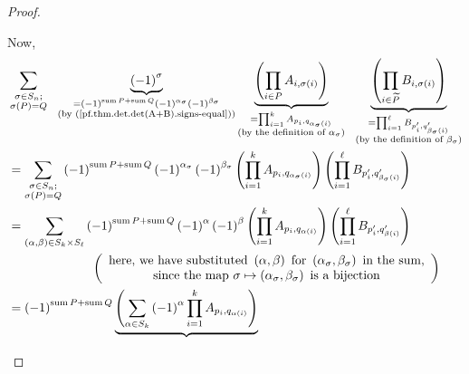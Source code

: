 \begin{proof}
\begin{fineprint}
Now,%
\begin{align}
&  \sum_{\substack{\sigma\in S_{n};\\\sigma\left(  P\right)  =Q}%
}\ \ \underbrace{\left(  -1\right)  ^{\sigma}}_{\substack{=\left(  -1\right)
^{\operatorname*{sum}P+\operatorname*{sum}Q}\left(  -1\right)  ^{\alpha
_{\sigma}}\left(  -1\right)  ^{\beta_{\sigma}}\\\text{(by
(\ref{pf.thm.det.det(A+B).signs-equal}))}}}\underbrace{\left(  \prod
\limits_{i\in P}A_{i,\sigma\left(  i\right)  }\right)  }_{\substack{=\prod
_{i=1}^{k}A_{p_{i},q_{\alpha_{\sigma}\left(  i\right)  }}\\\text{(by the
definition of }\alpha_{\sigma}\text{)}}}\ \ \underbrace{\left(  \prod
\limits_{i\in\widetilde{P}}B_{i,\sigma\left(  i\right)  }\right)
}_{\substack{=\prod_{i=1}^{\ell}B_{p_{i}^{\prime},q_{\beta_{\sigma}\left(
i\right)  }^{\prime}}\\\text{(by the definition of }\beta_{\sigma}\text{)}%
}}\nonumber\\
&  =\sum_{\substack{\sigma\in S_{n};\\\sigma\left(  P\right)  =Q}}\left(
-1\right)  ^{\operatorname*{sum}P+\operatorname*{sum}Q}\left(  -1\right)
^{\alpha_{\sigma}}\left(  -1\right)  ^{\beta_{\sigma}}\left(  \prod_{i=1}%
^{k}A_{p_{i},q_{\alpha_{\sigma}\left(  i\right)  }}\right)  \left(
\prod_{i=1}^{\ell}B_{p_{i}^{\prime},q_{\beta_{\sigma}\left(  i\right)
}^{\prime}}\right) \nonumber\\
&  =\sum_{\left(  \alpha,\beta\right)  \in S_{k}\times S_{\ell}}\left(
-1\right)  ^{\operatorname*{sum}P+\operatorname*{sum}Q}\left(  -1\right)
^{\alpha}\left(  -1\right)  ^{\beta}\left(  \prod_{i=1}^{k}A_{p_{i}%
,q_{\alpha\left(  i\right)  }}\right)  \left(  \prod_{i=1}^{\ell}%
B_{p_{i}^{\prime},q_{\beta\left(  i\right)  }^{\prime}}\right) \nonumber\\
&  \ \ \ \ \ \ \ \ \ \ \ \ \ \ \ \ \ \ \ \ \left(
\begin{array}
[c]{c}%
\text{here, we have substituted }\left(  \alpha,\beta\right)  \text{ for
}\left(  \alpha_{\sigma},\beta_{\sigma}\right)  \text{ in the sum,}\\
\text{since the map }\sigma\mapsto\left(  \alpha_{\sigma},\beta_{\sigma
}\right)  \text{ is a bijection}%
\end{array}
\right) \nonumber\\
&  =\left(  -1\right)  ^{\operatorname*{sum}P+\operatorname*{sum}%
Q}\underbrace{\left(  \sum_{\alpha\in S_{k}}\left(  -1\right)  ^{\alpha}%
\prod_{i=1}^{k}A_{p_{i},q_{\alpha\left(  i\right)  }}\right)  }%

\end{align}
\end{fineprint}
\end{proof}
